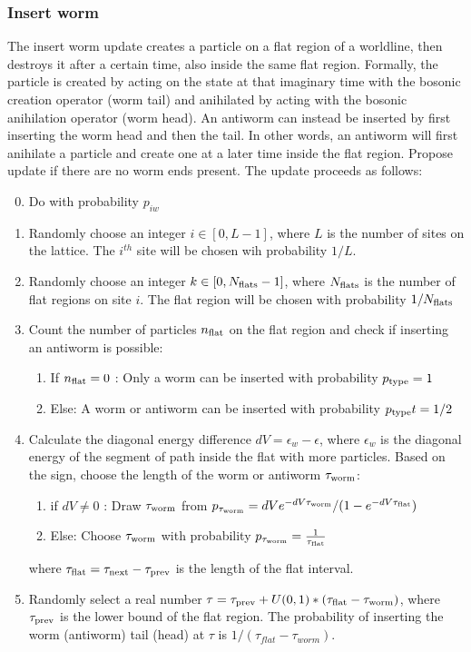 \documentclass[12pt, two sided]{article}
\begin{document}
	\subsubsection{Insert worm}      
    The insert worm update creates a particle on a flat region of a worldline, then destroys it after a certain time, also inside the same flat region. Formally, the particle is created by acting on the state at that imaginary time with the bosonic creation operator (worm tail) and anihilated by acting with the bosonic anihilation operator (worm head). An antiworm can instead be inserted by first inserting the worm head and then the tail. In other words, an antiworm will first anihilate a particle and create one at a later time inside the flat region. Propose update if there are no worm ends present. The update proceeds as follows: \\
%
    \begin{enumerate}
        \setcounter{enumi}{-1}
    \item Do with probability $p_{iw}$
        \item Randomly choose an integer $i \in [0,L-1]$, where $L$ is the number of sites on the lattice. The $i^{th}$ site will be chosen wih probability $1/L$.
        \item Randomly choose an integer $k \in [0,N_{\rm{flats}} - 1]$, where $N_{\rm{flats}}$ is the number of flat regions on site $i$. The flat region will be chosen with probability $1/N_{\rm{flats}}$
        \item Count the number of particles $n_{\rm{flat}}$ on the flat region and check if inserting an antiworm is possible:
            \begin{enumerate}
            \item If $n_{\rm{flat}} = 0$ : Only a worm can be inserted with probability $p_{\rm{type}} = 1$
            \item Else: A worm or antiworm can be inserted with probability $p_{\rm{type}}t = 1/2$
            \end{enumerate}
        \item Calculate the diagonal energy difference $dV = \epsilon_w - \epsilon$, where $\epsilon_w$ is the diagonal energy of the segment of path inside the flat with more particles. Based on the sign, choose the length of the worm or antiworm $\tau_{\rm{worm}}$:
        	     \begin{enumerate}
	     \item{if $dV \neq 0$ : Draw $\tau_{\rm{worm}}$ from $p_{\tau_{\rm{worm}}}=dV e^{-dV\tau_{\rm{worm}}}/(1-e^{-dV \tau_{\rm{flat}}})$}
	     \item{Else: Choose $\tau_{\rm{worm}}$ with probability $p_{\tau_{\rm{worm}}} = \frac{1}{\tau_{\rm{flat}}}$}
	     \end{enumerate}
	     where $\tau_{\rm{flat}} = \tau_{\rm{next}}-\tau_{\rm{prev}}$ is the length of the flat interval.
        \item Randomly select a real number $\tau = \tau_{\rm{prev}} + U(0,1)*(\tau_{\rm{flat}}-\tau_{\rm{worm}})$, where $\tau_{\rm{prev}}$ is the lower bound of the flat region. The probability of inserting the worm (antiworm) tail (head) at $\tau$ is $1/(\tau_{flat} - \tau_{worm})$.
    \end{enumerate}
\end{document}
